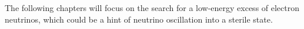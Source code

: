 
The following chapters will focus on the search for a low-energy excess of electron neutrinos, which could be a hint of neutrino oscillation into a sterile state. 